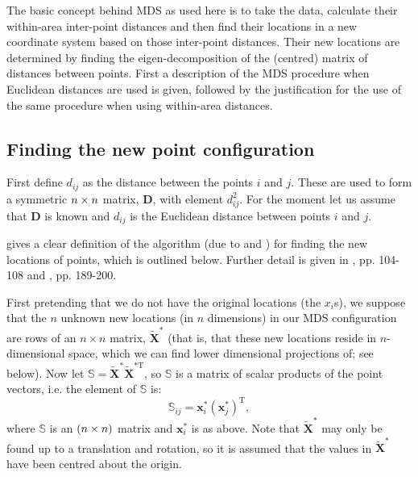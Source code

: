The basic concept behind MDS as used here is to take the data, calculate their within-area inter-point distances and then find their locations in a new coordinate system based on those inter-point distances. Their new locations are determined by finding the eigen-decomposition of the (centred) matrix of distances between points. First a description of the MDS procedure when Euclidean distances are used is given, followed by the justification for the use of the same procedure when using within-area distances. 

\subsection{Finding the new point configuration}

First define $d_{ij}$ as the distance between the points $i$ and $j$. These are used to form a symmetric $n \times n$ matrix, $\mathbf{D}$, with \ijth element $d^2_{ij}$. For the moment let us assume that $\mathbf{D}$ is known and $d_{ij}$ is the Euclidean distance between points $i$ and $j$. 

 gives a clear definition of the algorithm (due to \cite{schoenberg35} and \cite{torgerson}) for finding the new locations of points, which is outlined below. Further detail is given in , pp. 104-108 and , pp. 189-200.

\label{cor-r31}First pretending that we do not have the original locations (the $x_i$s), we suppose that the $n$ unknown new locations (in $n$ dimensions) in our MDS configuration are rows of an $n \times n$ matrix, $\tilde{\mathbf{X}}^*$ (that is, that these new locations reside in $n$-dimensional space, which we can find lower dimensional projections of; see below). Now let $\mathbb{S}=\tilde{\mathbf{X}}^{*} \tilde{\mathbf{X}}^{*\text{T}} $, so $\mathbb{S}$ is a matrix of scalar products of the point vectors, i.e. the \ijth element of $\mathbb{S}$ is:
\begin{equation}
\mathbb{S}_{ij} = \mathbf{x}_i^* \left ( \mathbf{x}_j^* \right)^\text{T},
\label{selem}
\end{equation}
where $\mathbb{S}$ is an $(n\times n)$ matrix and $\mathbf{x}_i^*$ is as above. Note that $\tilde{\mathbf{X}}^*$ may only be found up to a translation and rotation, so it is assumed that the values in $\tilde{\mathbf{X}}^*$ have been centred about the origin.


